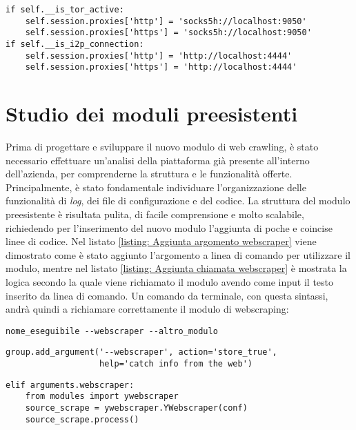 \begin{lstlisting}[caption=Configurazione dei proxy di requests per l'accesso al dark web.,
	label=listing: configurazione proxy requests]
if self.__is_tor_active:
    self.session.proxies['http'] = 'socks5h://localhost:9050'
    self.session.proxies['https'] = 'socks5h://localhost:9050'
if self.__is_i2p_connection:
    self.session.proxies['http'] = 'http://localhost:4444'
    self.session.proxies['https'] = 'http://localhost:4444'
\end{lstlisting}
\section{Studio dei moduli preesistenti}

Prima di progettare e sviluppare il nuovo modulo di web crawling, è stato necessario effettuare un’analisi della piattaforma già presente all’interno dell’azienda, per comprenderne la struttura e le funzionalità offerte. Principalmente, è stato fondamentale individuare l’organizzazione delle funzionalità di \emph{log}, dei file di configurazione e del codice. La struttura del modulo preesistente è risultata pulita, di facile comprensione e molto scalabile, richiedendo per l’inserimento del nuovo modulo l’aggiunta di poche e coincise linee di codice. Nel listato \ref{listing: Aggiunta argomento webscraper} viene dimostrato come è stato aggiunto l'argomento a linea di comando per utilizzare il modulo, mentre nel listato \ref{listing: Aggiunta chiamata webscraper} è mostrata la logica secondo la quale viene richiamato il modulo avendo come input il testo inserito da linea di comando. Un comando da terminale, con questa sintassi, andrà quindi a richiamare correttamente il modulo di webscraping:
\centerline{\texttt{nome\_eseguibile -{}-webscraper -{}-altro\_modulo}}


\begin{lstlisting}[caption=Aggiunta dell’argomento da terminale.,
	label=listing: Aggiunta argomento webscraper]
group.add_argument('--webscraper', action='store_true',
                   help='catch info from the web')
\end{lstlisting}

\begin{lstlisting}[caption=Logica per l’utilizzo del webscraper.,
  	label=listing: Aggiunta chiamata webscraper]
elif arguments.webscraper:
    from modules import ywebscraper
    source_scrape = ywebscraper.YWebscraper(conf)
    source_scrape.process()
\end{lstlisting}

